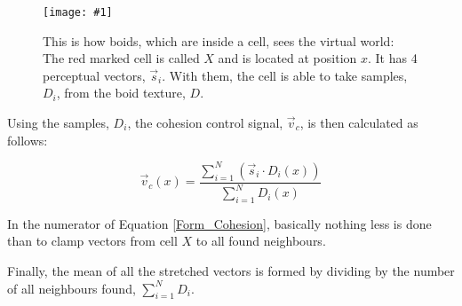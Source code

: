 \documentclass[a4paper, 10pt, journal]{wissarbIEEE}      %
\newcommand{\bild}[3]{
\begin{figure}[h]
\centering
  \texttt{[image: \#1]}
  \caption{#3}
  \label{#1}
\end{figure}}
\begin{document}
\bild{bilder/ChesionAbb}{4cm}{
This is how boids, which are inside a cell, sees the virtual world: The red marked cell is called $ X $ and is located at position $ x $. It has 4 perceptual vectors, $ \vec{s}_i $. With them, the cell is able to take samples, $ D_i $, from the boid texture, $ D $.
}


Using the samples, $D_i$, the cohesion control signal, $\vec{v}_c$, is then calculated as follows:


\begin{equation}
\vec{v}_c(x) = \frac{\sum_{i=1}^N( \vec{s}_i \cdot D_i(x))}{\sum_{i=1}^N D_i(x)}
\label{Form_Cohesion}
\end{equation}


In the numerator of Equation \ref{Form_Cohesion}, basically nothing less is done than to clamp vectors from cell $X$ to all found neighbours.



Finally, the mean of all the stretched vectors is formed by dividing by the number of all neighbours found, $\sum_{i=1}^N D_i$.

\end{document}

